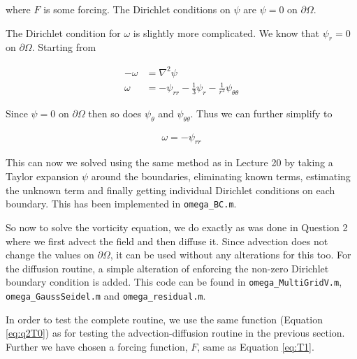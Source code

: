 \documentclass{article}
\begin{document}
where $F$ is some forcing. The Dirichlet conditions on $\psi$ are $\psi = 0$ on $\partial \Omega$. 

The Dirichlet condition for $\omega$ is slightly more complicated. We know that $\psi_r = 0$ on $\partial \Omega$. Starting from 

\begin{align*}
	-\omega &= \nabla^2 \psi \\
	\omega &= -\psi_{rr} - \frac{1}{3}\psi_r - \frac{1}{r^2}\psi_{\theta \theta}
\end{align*}

Since $\psi = 0$ on $\partial \Omega$ then so does $\psi_\theta$ and $\psi_{\theta \theta}$. Thus we can further simplify to

\begin{align*}
	\omega = -\psi_{rr}
\end{align*}

This can now we solved using the same method as in Lecture 20 by taking a Taylor expansion $\psi$ around the boundaries, eliminating known terms, estimating the unknown term and finally getting individual Dirichlet conditions on each boundary. This has been implemented in \texttt{omega\_BC.m}. 

So now to solve the vorticity equation, we do exactly as was done in Question 2 where we first advect the field and then diffuse it. Since advection does not change the values on $\partial \Omega$, it can be used without any alterations for this too. For the diffusion routine, a simple alteration of enforcing the non-zero Dirichlet boundary condition is added. This code can be found in \texttt{omega\_MultiGridV.m}, \texttt{omega\_GaussSeidel.m} and \texttt{omega\_residual.m}.

In order to test the complete routine, we use the same function (Equation \ref{eq:q2T0}) as for testing the advection-diffusion routine in the previous section. Further we  have chosen a forcing function, $F$, same as Equation \ref{eq:T1}.
\end{document}
